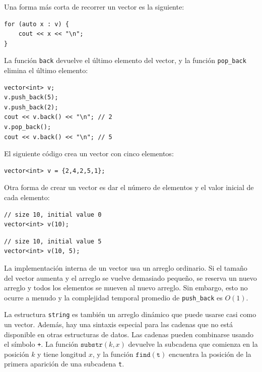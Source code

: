 \begin{samepage}
Una forma más corta de recorrer un vector es la siguiente:

\begin{lstlisting}
for (auto x : v) {
    cout << x << "\n";
}
\end{lstlisting}
\end{samepage}

La función \texttt{back} devuelve el último elemento
del vector, y
la función \texttt{pop\_back} elimina el último elemento:

\begin{lstlisting}
vector<int> v;
v.push_back(5);
v.push_back(2);
cout << v.back() << "\n"; // 2
v.pop_back();
cout << v.back() << "\n"; // 5
\end{lstlisting}

El siguiente código crea un vector con cinco elementos:

\begin{lstlisting}
vector<int> v = {2,4,2,5,1};
\end{lstlisting}

Otra forma de crear un vector es dar el número
de elementos y el valor inicial de cada elemento:

\begin{lstlisting}
// size 10, initial value 0
vector<int> v(10);
\end{lstlisting}
\begin{lstlisting}
// size 10, initial value 5
vector<int> v(10, 5);
\end{lstlisting}

La implementación interna de un vector
usa un arreglo ordinario.
Si el tamaño del vector aumenta y
el arreglo se vuelve demasiado pequeño,
se reserva un nuevo arreglo y todos los
elementos se mueven al nuevo arreglo.
Sin embargo, esto no ocurre a menudo y la
complejidad temporal promedio de
\texttt{push\_back} es $O(1)$.


La estructura \texttt{string}
es también un arreglo dinámico que puede usarse casi como un vector.
Además, hay una sintaxis especial para las cadenas
que no está disponible en otras estructuras de datos.
Las cadenas pueden combinarse usando el símbolo \texttt{+}.
La función $\texttt{substr}(k,x)$ devuelve la subcadena
que comienza en la posición $k$ y tiene longitud $x$,
y la función $\texttt{find}(\texttt{t})$ encuentra la posición
de la primera aparición de una subcadena \texttt{t}.


